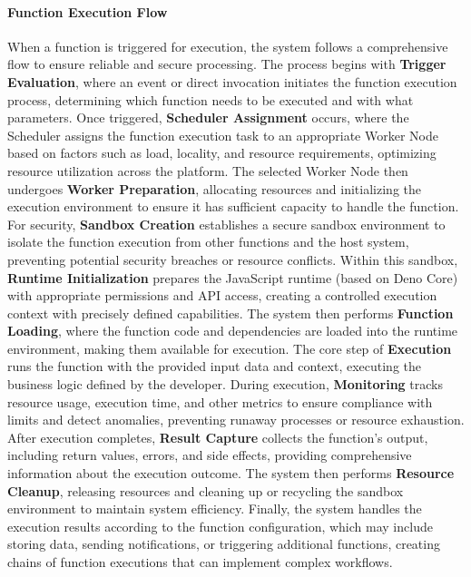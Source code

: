 \documentclass[11pt]{article}
\begin{document}
\paragraph{Function Execution Flow}
When a function is triggered for execution, the system follows a comprehensive flow to ensure reliable and secure processing. The process begins with \textbf{Trigger Evaluation}, where an event or direct invocation initiates the function execution process, determining which function needs to be executed and with what parameters. Once triggered, \textbf{Scheduler Assignment} occurs, where the Scheduler assigns the function execution task to an appropriate Worker Node based on factors such as load, locality, and resource requirements, optimizing resource utilization across the platform. The selected Worker Node then undergoes \textbf{Worker Preparation}, allocating resources and initializing the execution environment to ensure it has sufficient capacity to handle the function. For security, \textbf{Sandbox Creation} establishes a secure sandbox environment to isolate the function execution from other functions and the host system, preventing potential security breaches or resource conflicts. Within this sandbox, \textbf{Runtime Initialization} prepares the JavaScript runtime (based on Deno Core) with appropriate permissions and API access, creating a controlled execution context with precisely defined capabilities. The system then performs \textbf{Function Loading}, where the function code and dependencies are loaded into the runtime environment, making them available for execution. The core step of \textbf{Execution} runs the function with the provided input data and context, executing the business logic defined by the developer. During execution, \textbf{Monitoring} tracks resource usage, execution time, and other metrics to ensure compliance with limits and detect anomalies, preventing runaway processes or resource exhaustion. After execution completes, \textbf{Result Capture} collects the function's output, including return values, errors, and side effects, providing comprehensive information about the execution outcome. The system then performs \textbf{Resource Cleanup}, releasing resources and cleaning up or recycling the sandbox environment to maintain system efficiency. Finally, the system handles the execution results according to the function configuration, which may include storing data, sending notifications, or triggering additional functions, creating chains of function executions that can implement complex workflows.
\end{document}
